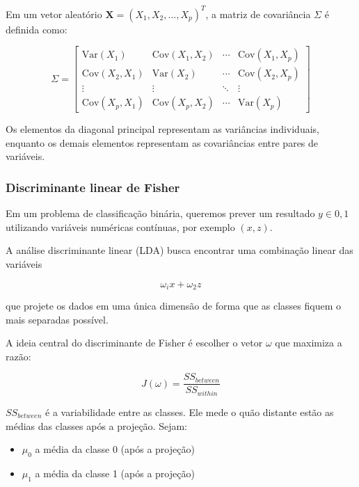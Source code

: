 \documentclass{article}
\begin{document}
Em um vetor aleatório $\mathbf{X} = (X_1, X_2, \dots, X_p)^T$, a matriz de
covariância $\Sigma$ é definida como:

\begin{equation}
\Sigma =
\begin{bmatrix}
\mathrm{Var}(X_1) & \mathrm{Cov}(X_1,X_2) & \cdots & \mathrm{Cov}(X_1,X_p) \\
\mathrm{Cov}(X_2,X_1) & \mathrm{Var}(X_2) & \cdots & \mathrm{Cov}(X_2,X_p) \\
\vdots & \vdots & \ddots & \vdots \\
\mathrm{Cov}(X_p,X_1) & \mathrm{Cov}(X_p,X_2) & \cdots & \mathrm{Var}(X_p)
\end{bmatrix}
\end{equation}

Os elementos da diagonal principal representam as variâncias individuais,
enquanto os demais elementos representam as covariâncias entre pares de variáveis.

\subsubsection{Discriminante linear de Fisher}

Em um problema de classificação binária, queremos prever um resultado
$y \in {0, 1}$ utilizando variáveis numéricas contínuas, por exemplo 
$(x, z)$.

A análise discriminante linear (LDA) busca encontrar uma combinação 
linear das variáveis 

\begin{equation*}
    \omega_i x+ \omega_2 z
\end{equation*}

que projete os dados em uma única dimensão de forma que as classes 
fiquem o mais separadas possível.

A ideia central do discriminante de Fisher é escolher o vetor $\omega$
que maximiza a razão:

\begin{equation}
    J(\omega) = \frac{SS_{between}}{SS_{within}}
\end{equation}

$SS_{between}$ é a variabilidade entre as classes. Ele mede o quão 
distante estão as médias das classes após a projeção. Sejam:

\begin{itemize}
    \item $\mu_0$ a média da classe 0 (após a projeção)
    \item $\mu_1$ a média da classe 1 (após a projeção)
\end{itemize}
\end{document}

